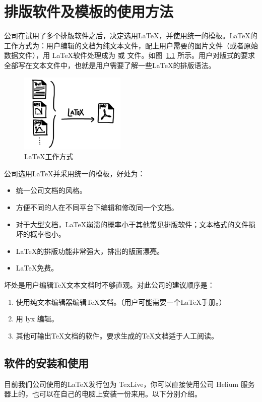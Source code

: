 \chapter{排版软件及模板的使用方法}
公司在试用了多个排版软件之后，决定选用\LaTeX ，并使用统一的模板。\LaTeX 的工作方式为：用户编辑的文档为纯文本文件，配上用户需要的图片文件（或者原始数据文件），用 \LaTeX 软件处理成为  或  文件。如图~\ref{latex} 所示。用户对版式的要求全部写在文本文件中，也就是用户需要了解一些\LaTeX 的排版语法。

\begin{figure}[htbp]\centering
\includegraphics[width=0.45\textwidth]{latex_wm.jpg} 
\caption{\label{latex}\LaTeX 工作方式}
\end{figure}

公司选用\LaTeX 并采用统一的模板，好处为：
\begin{itemize}
\item 统一公司文档的风格。
\item 方便不同的人在不同平台下编辑和修改同一个文档。
\item 对于大型文档，\LaTeX 崩溃的概率小于其他常见排版软件；文本格式的文件损坏的概率也小。
\item \LaTeX 的排版功能非常强大，排出的版面漂亮。
\item \LaTeX 免费。
\end{itemize}
坏处是用户编辑\TeX 文本文档时不够直观。对此公司的建议顺序是：
\begin{enumerate}
\item 使用纯文本编辑器编辑\TeX 文档。（用户可能需要一个\LaTeX 手册\cite{oetiker1995not}。）
\item 用 lyx 编辑。
\item 其他可输出\TeX 文档的软件。要求生成的\TeX 文档适于人工阅读。
\end{enumerate}

\section{软件的安装和使用}
目前我们公司使用的\LaTeX 发行包为 TexLive，你可以直接使用公司 Helium 服务器上的，也可以在自己的电脑上安装一份来用。以下分别介绍。

